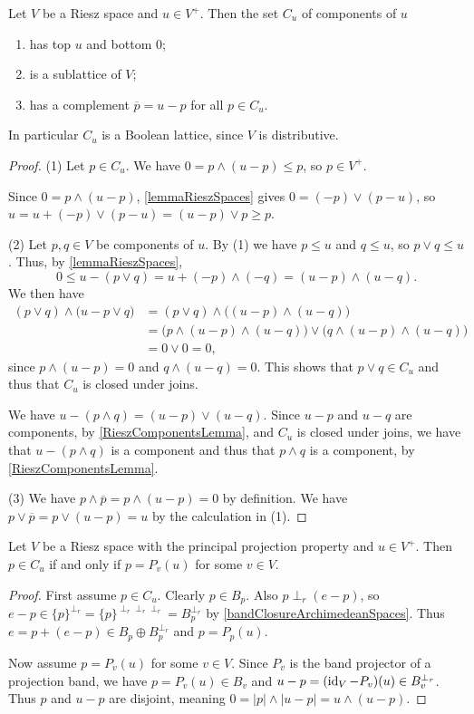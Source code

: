 \begin{proposition}
Let $V$ be a Riesz space and $u\in V^+$. Then the set $C_u$ of components of $u$
\begin{enumerate}
\item has top $u$ and bottom $0$;
\item is a sublattice of $V$;
\item has a complement $\overline{p} = u-p$ for all $p\in C_u$.
\end{enumerate}
In particular $C_u$ is a Boolean lattice, since $V$ is distributive.
\end{proposition}
\begin{proof}
(1) Let $p\in C_u$. We have $0 = p\wedge (u-p) \leq p$, so $p\in V^+$.

Since $0 = p\wedge (u-p)$, \ref{lemmaRieszSpaces} gives $0 = (-p)\vee (p-u)$, so $u = u+(-p)\vee (p-u) = (u-p)\vee p \geq p$.

(2) Let $p,q\in V$ be components of $u$. By (1) we have $p\leq u$ and $q\leq u$, so $p\vee q \leq u$. Thus, by \ref{lemmaRieszSpaces},
\[ 0 \leq u - (p\vee q) = u + (-p)\wedge(-q) = (u-p)\wedge (u-q). \]
We then have
\begin{align*}
(p\vee q)\wedge \big(u - p\vee q\big) &= (p\vee q)\wedge \big((u-p)\wedge (u-q)\big) \\
&= \big(p \wedge (u-p)\wedge (u-q)\big)\vee \big(q\wedge (u-p)\wedge (u-q)\big) \\
&= 0\vee 0 = 0,
\end{align*}
since $p \wedge (u-p) = 0$ and $q \wedge (u-q) = 0$. This shows that $p\vee q\in C_u$ and thus that $C_u$ is closed under joins.

We have $u - (p\wedge q) = (u-p)\vee (u-q)$. Since $u-p$ and $u-q$ are components, by \ref{RieszComponentsLemma}, and $C_u$ is closed under joins, we have that $u - (p\wedge q)$ is a component and thus that $p\wedge q$ is a component, by \ref{RieszComponentsLemma}.

(3) We have $p\wedge \overline{p} = p\wedge (u-p) = 0$ by definition. We have $p\vee \overline{p} = p\vee (u-p) = u$ by the calculation in (1).
\end{proof}

\begin{proposition}
Let $V$ be a Riesz space with the principal projection property and $u\in V^+$. Then $p\in C_u$ \textup{if and only if} $p = P_v(u)$ for some $v\in V$.
\end{proposition}
\begin{proof}
First assume $p\in C_u$. Clearly $p\in B_p$. Also $p\perp_r(e-p)$, so $e-p \in \{p\}^{\perp_r} = \{p\}^{\perp_r\perp_r\perp_r} = B_p^{\perp_r}$ by \ref{bandClosureArchimedeanSpaces}. Thus $e = p + (e-p) \in B_p\oplus B_p^{\perp_r}$ and $p = P_p(u)$.

Now assume $p = P_v(u)$ for some $v\in V$. Since $P_v$ is the band projector of a projection band, we have $p = P_v(u) \in B_v$ and $u-p = (\operatorname{id}_V- P_v)(u) \in B_v^{\perp_r}$. Thus $p$ and $u-p$ are disjoint, meaning $0 = |p|\wedge |u-p| = u\wedge (u-p)$.
\end{proof}


